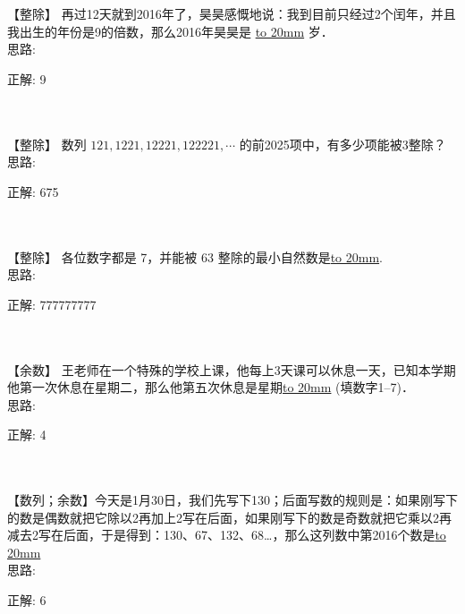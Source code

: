 
\item {
    【整除】
    再过12天就到2016年了，昊昊感慨地说：我到目前只经过2个闰年，并且我出生的年份是9的倍数，那么2016年昊昊是 \underline{\hbox to 20mm{}} 岁． 
    \ifshowSolution
        \fangsong{}
        \\
        思路:

        正解: 9 
    \else
        \\ \\ \\
    \fi
}

\item {
    【整除】
    数列 $121, 1221, 12221, 122221,\cdots$ 的前2025项中，有多少项能被3整除？
    \ifshowSolution
        \fangsong{}
        \\
        思路:

        正解: 675
    \else
        \\ \\ \\
    \fi
}

\item {
    【整除】
    各位数字都是 7，并能被 63 整除的最小自然数是\underline{\hbox to 20mm{}}.
    \ifshowSolution
        \fangsong{}
        \\
        思路:

        正解: 777777777
    \else
        \\ \\ \\
    \fi
}

\item {
    【余数】
    王老师在一个特殊的学校上课，他每上3天课可以休息一天，已知本学期他第一次休息在星期二，那么他第五次休息是星期\underline{\hbox to 20mm{}} (填数字1--7)．
    \ifshowSolution
        \fangsong{}
        \\
        思路:

        正解: 4
    \else
        \\ \\ \\
    \fi
}

\item {
    【数列；余数】今天是1月30日，我们先写下130；后面写数的规则是：如果刚写下的数是偶数就把它除以2再加上2写在后面，如果刚写下的数是奇数就把它乘以2再减去2写在后面，于是得到：130、67、132、68…，那么这列数中第2016个数是\underline{\hbox to 20mm{}}
    \ifshowSolution
        \fangsong{}
        \\
        思路:

        正解:  6
    \else
        \\ \\ \\
    \fi
}


